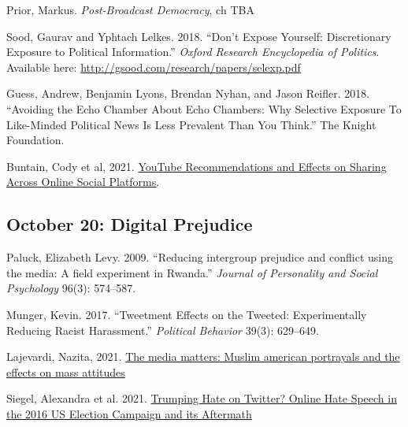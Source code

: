 \vspace{-.1in}\documentclass[11pt]{article}
\begin{document}
Prior, Markus. \textit{Post-Broadcast Democracy}, ch TBA


\noindent Sood, Gaurav and Yphtach Lelkes. 2018. ``Don't Expose Yourself: Discretionary Exposure to Political Information.'' \emph{Oxford Research Encyclopedia of Politics}. Available here: \url{http://gsood.com/research/papers/selexp.pdf}

\noindent Guess, Andrew, Benjamin Lyons, Brendan Nyhan, and Jason Reifler. 2018. ``Avoiding the Echo Chamber About Echo Chambers: Why Selective Exposure To Like-Minded Political News Is Less Prevalent Than You Think.'' The Knight Foundation.


\noindent Buntain, Cody et al, 2021. \href{https://dl.acm.org/doi/10.1145/3449085}{YouTube Recommendations and Effects on Sharing Across Online Social Platforms}.
	




\subsection*{October 20: Digital Prejudice }

Paluck, Elizabeth Levy. 2009. ``Reducing intergroup prejudice and conflict using the media: A field experiment in Rwanda.'' \emph{Journal of Personality and Social Psychology} 96(3): 574--587.


\noindent Munger, Kevin. 2017. ``Tweetment Effects on the Tweeted: Experimentally Reducing Racist Harassment.'' \emph{Political Behavior} 39(3): 629--649.


\noindent Lajevardi, Nazita, 2021. \href{https://www.journals.uchicago.edu/doi/full/10.1086/711300?casa_token=wITxV2WJeaQAAAAA:1wco3QZFwUnMq6EOzYON4LXw2XZUU-By0eeehfQq8QuDzgcUuQW93THNT8o7USkGF81ypdGHcHA}{The media matters: Muslim american portrayals and the effects on mass attitudes}

\noindent Siegel, Alexandra et al. 2021. \href{https://alexandra-siegel.com/wp-content/uploads/2019/08/qjps_election_hatespeech_RR.pdf}{Trumping Hate on Twitter? Online Hate Speech in the 2016 US Election Campaign and its Aftermath}
\end{document}
